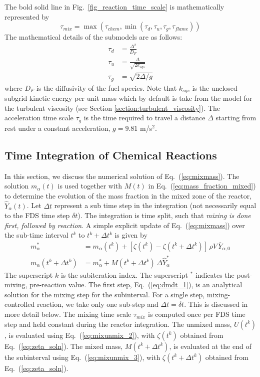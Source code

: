 The bold solid line in Fig.~\ref{fig_reaction_time_scale} is mathematically represented by
\begin{equation}
\label{eqn_tau_mix}
\tau_{mix} = \max(\tau_{chem},\min(\tau_d,\tau_u,\tau_g,\tau_{flame}))
\end{equation}
The mathematical details of the submodels are as follows:
\begin{align}
\label{eq:tau_diff} \tau_{d} &= \frac{\Delta^2}{D_F} \\
\label{eq:tau_sgs}  \tau_{u} &= \frac{\Delta}{\sqrt{2k_{sgs}}} \\
\label{eqn_tau_grav}\tau_{g} &= \sqrt{ 2\Delta/g }
\end{align}
where $D_F$ is the diffusivity of the fuel species. Note that $k_{sgs}$ is the unclosed subgrid kinetic energy per unit mass which by default is take from the model for the turbulent viscosity (see Section \ref{section:turbulent_viscosity}). The acceleration time scale $\tau_{g}$ is the time required to travel a distance $\Delta$ starting from rest under a constant acceleration, $g=9.81$ m/s$^2$.


\subsection{Time Integration of Chemical Reactions}
\label{sec:reac_time_integration}

In this section, we discuss the numerical solution of Eq.~(\ref{eq:mixmass}).  The solution $m_\alpha(t)$ is used together with $M(t)$ in Eq.~(\ref{eq:mass_fraction_mixed}) to determine the evolution of the mass fraction in the mixed zone of the reactor, $\hat{Y}_\alpha(t)$.  Let $\Delta t$ represent a sub time step in the integration (not necessarily equal to the FDS time step $\delta t$).  The integration is time split, such that \emph{mixing is done first, followed by reaction}. A simple explicit update of Eq.~(\ref{eq:mixmass}) over the sub-time interval $t^k$ to $t^k + \Delta t^k$ is given by
\begin{align}
\label{eq:dmdt_1} m_\alpha^* &= m_{\alpha}(t^k) + [ \zeta(t^k) - \zeta(t^k+\Delta t^k) ] \, \rho V \, \overline{Y}_{\alpha,0}  \\
\label{eq:dmdt_2} m_\alpha(t^k + \Delta t^k) &= m_{\alpha}^* + M(t^k + \Delta t^k) \, \Delta \hat{Y}_\alpha^* 
\end{align}
The superscript $k$ is the subiteration index.  The superscript $^*$ indicates the post-mixing, pre-reaction value.  The first step, Eq.~(\ref{eq:dmdt_1}), is an analytical solution for the mixing step for the subinterval.  For a single step, mixing-controlled reaction, we take only one sub-step and $\Delta t = \delta t$.  This is discussed in more detail below.  The mixing time scale $\tau_{mix}$ is computed once per FDS time step and held constant during the reactor integration. The unmixed mass, $U(t^k)$, is evaluated using Eq.~(\ref{eq:mixunmix_2}), with $\zeta(t^k)$ obtained from Eq.~(\ref{eq:zeta_soln}).  The mixed mass, $M(t^k + \Delta t^k)$, is evaluated at the end of the subinterval using Eq.~(\ref{eq:mixunmix_3}), with $\zeta(t^k + \Delta t^k)$ obtained from Eq.~(\ref{eq:zeta_soln}).

